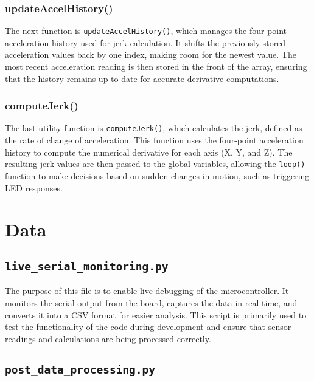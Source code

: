 \documentclass[12pt]{report}
\begin{document}
\subsubsection*{updateAccelHistory()}
The next function is \texttt{updateAccelHistory()}, which manages the four-point acceleration history used for jerk calculation. It shifts the previously stored acceleration values back by one index, making room for the newest value. The most recent acceleration reading is then stored in the front of the array, ensuring that the history remains up to date for accurate derivative computations.


\subsubsection*{computeJerk()}
The last utility function is \texttt{computeJerk()}, which calculates the jerk, defined as the rate of change of acceleration. This function uses the four-point acceleration history to compute the numerical derivative for each axis (X, Y, and Z). The resulting jerk values are then passed to the global variables, allowing the \texttt{loop()} function to make decisions based on sudden changes in motion, such as triggering LED responses.









\section{Data}

\subsection{\texttt{live\_serial\_monitoring.py}}

The purpose of this file is to enable live debugging of the microcontroller. It monitors the serial output from the board, captures the data in real time, and converts it into a CSV format for easier analysis. This script is primarily used to test the functionality of the code during development and ensure that sensor readings and calculations are being processed correctly.

\subsection{\texttt{post\_data\_processing.py}}
\end{document}
